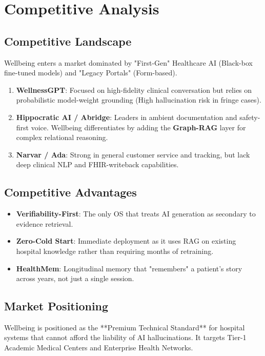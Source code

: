 \documentclass[12pt,a4paper]{article}
\begin{document}
\section{Competitive Analysis}

\subsection{Competitive Landscape}
Wellbeing enters a market dominated by "First-Gen" Healthcare AI (Black-box fine-tuned models) and "Legacy Portals" (Form-based).

\begin{enumerate}
    \item \textbf{WellnessGPT}: Focused on high-fidelity clinical conversation but relies on probabilistic model-weight grounding (High hallucination risk in fringe cases).
    \item \textbf{Hippocratic AI / Abridge}: Leaders in ambient documentation and safety-first voice. Wellbeing differentiates by adding the \textbf{Graph-RAG} layer for complex relational reasoning.
    \item \textbf{Narvar / Ada}: Strong in general customer service and tracking, but lack deep clinical NLP and FHIR-writeback capabilities.
\end{enumerate}

\subsection{Competitive Advantages}
\begin{itemize}
    \item \textbf{Verifiability-First}: The only OS that treats AI generation as secondary to evidence retrieval.
    \item \textbf{Zero-Cold Start}: Immediate deployment as it uses RAG on existing hospital knowledge rather than requiring months of retraining.
    \item \textbf{HealthMem}: Longitudinal memory that "remembers" a patient's story across years, not just a single session.
\end{itemize}

\subsection{Market Positioning}
Wellbeing is positioned as the **Premium Technical Standard** for hospital systems that cannot afford the liability of AI hallucinations. It targets Tier-1 Academic Medical Centers and Enterprise Health Networks.
\end{document}

